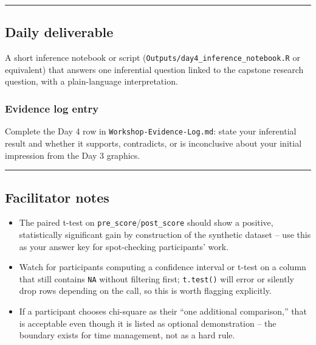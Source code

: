 \documentclass[11pt]{article}
\providecommand{\tightlist}{%
  \setlength{\itemsep}{0pt}\setlength{\parskip}{0pt}}
\begin{document}
\begin{center}\rule{0.5\linewidth}{0.5pt}\end{center}

\hypertarget{daily-deliverable}{%
\subsection{Daily deliverable}\label{daily-deliverable}}

A short inference notebook or script
(\texttt{Outputs/day4\_inference\_notebook.R} or equivalent) that
answers one inferential question linked to the capstone research
question, with a plain-language interpretation.

\hypertarget{evidence-log-entry}{%
\subsubsection{Evidence log entry}\label{evidence-log-entry}}

Complete the Day 4 row in \texttt{Workshop-Evidence-Log.md}: state your
inferential result and whether it supports, contradicts, or is
inconclusive about your initial impression from the Day 3 graphics.

\begin{center}\rule{0.5\linewidth}{0.5pt}\end{center}

\hypertarget{facilitator-notes}{%
\subsection{Facilitator notes}\label{facilitator-notes}}

\begin{itemize}
\tightlist
\item
  The paired t-test on \texttt{pre\_score}/\texttt{post\_score} should
  show a positive, statistically significant gain by construction of the
  synthetic dataset -- use this as your answer key for spot-checking
  participants' work.
\item
  Watch for participants computing a confidence interval or t-test on a
  column that still contains \texttt{NA} without filtering first;
  \texttt{t.test()} will error or silently drop rows depending on the
  call, so this is worth flagging explicitly.
\item
  If a participant chooses chi-square as their ``one additional
  comparison,'' that is acceptable even though it is listed as optional
  demonstration -- the boundary exists for time management, not as a
  hard rule.
\end{itemize}
\end{document}
